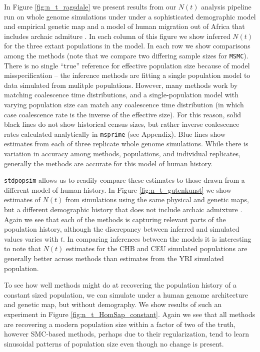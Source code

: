\documentclass[12pt,halfline,a4paper]{ouparticle}
\newcommand{\stdpopsim}{\texttt{stdpopsim}\xspace}
\newcommand{\MSMC}{\texttt{MSMC}\xspace}
\begin{document}
In Figure \ref{fig:n_t_ragsdale} we present results from our $N(t)$ analysis pipeline
run on whole genome simulations under under a sophisticated demographic model
and empirical genetic map and a model of human migration out of Africa
that includes archaic admiture \citep{ragsdale2019models}. In each column of this figure
we show inferred $N(t)$ for the three extant populations in the model.
In each row we show comparisons among the methods (note that we compare two differing
sample sizes for \MSMC).
There is no single ``true'' reference for effective population size
because of model misspecification -- the inference methods are fitting a single population model
to data simulated from mulitple populations.
However, many methods work by matching coalescence time distributions,
and a single-population model with varying population size can match any coalescence time distribution
(in which case coalescence rate is the inverse of the effective size).
For this reason, solid black lines do not show historical census sizes,
but rather inverse coalescence rates calculated analytically in \texttt{msprime} (see Appendix).
Blue lines show estimates from each of three replicate whole genome simulations.
While there is variation in accuracy among methods, populations, and individual replicates,
generally the methods are accurate for this model of human history.

\stdpopsim allows us to readily compare these estimates to those drawn from a different
model of human history. In Figure \ref{fig:n_t_gutenkunst} we show estimates of
$N(t)$ from simulations using the same physical and genetic maps, but a different demographic
history that does not include archaic admixture \citep{gutenkunst2009inferring}. Again we see that each
of the methods is capturing relevant parts of the population history, although the
discrepancy between inferred and simulated values varies with $t$. In comparing inferences between the
models it is interesting to note that $N(t)$ estimates for the CHB and CEU
simulated populations are generally better across methods than estimates from the YRI
simulated population.

To see how well methods might do at recovering the population history of a constant sized population,
we can simulate under a human genome architecture and genetic map, but without demography.
We show results of such an
experiment in Figure \ref{fig:n_t_HomSap_constant}. Again we see that all methods
are recovering a modern population size within a factor of two of the truth, however
SMC-based methods, perhaps due to their regularization, tend to learn sinusoidal
patterns of population size even though no change is present.
\end{document}
